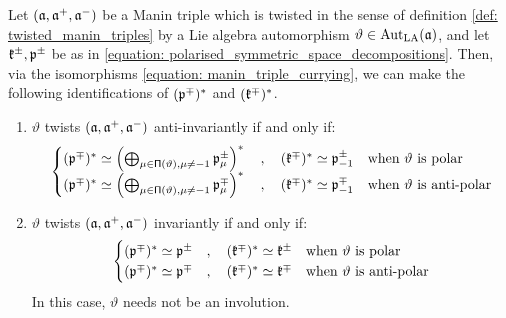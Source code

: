         \begin{lemma} \label{lemma: manin_triple_twists_and_duality}
            Let $(\mathfrak{a}, \mathfrak{a}^+, \mathfrak{a}^-)$ be a Manin triple which is twisted in the sense of definition \ref{def: twisted_manin_triples} by a Lie algebra automorphism $\vartheta \in \operatorname{Aut}_{\mathrm{LA}}(\mathfrak{a})$, and let $\mathfrak{k}^{\pm}, \mathfrak{p}^{\pm}$ be as in \eqref{equation: polarised_symmetric_space_decompositions}. Then, via the isomorphisms \eqref{equation: manin_triple_currying}, we can make the following identifications of $(\mathfrak{p}^{\mp})^*$ and $(\mathfrak{k}^{\mp})^*$.
            \begin{enumerate}
                \item $\vartheta$ twists $(\mathfrak{a}, \mathfrak{a}^+, \mathfrak{a}^-)$ anti-invariantly if and only if:
                    \begin{equation} \label{equation: anti_invariant_twist_duality}
                        \begin{cases}
                            (\mathfrak{p}^{\mp})^* \simeq \left( \bigoplus_{ \mu \in \mathsf{\Pi}(\vartheta), \mu \not = -1 } \mathfrak{p}_{\mu}^{\pm} \right)^* \quad, \quad (\mathfrak{k}^{\mp})^* \simeq \mathfrak{p}_{-1}^{\pm} & \text{when $\vartheta$ is polar}
                            \\
                            (\mathfrak{p}^{\mp})^* \simeq \left( \bigoplus_{ \mu \in \mathsf{\Pi}(\vartheta), \mu \not = -1 } \mathfrak{p}_{\mu}^{\mp} \right)^* \quad, \quad (\mathfrak{k}^{\mp})^* \simeq \mathfrak{p}_{-1}^{\mp} & \text{when $\vartheta$ is anti-polar}
                        \end{cases}
                    \end{equation}
                \item $\vartheta$ twists $(\mathfrak{a}, \mathfrak{a}^+, \mathfrak{a}^-)$ invariantly if and only if:
                    \begin{equation} \label{equation: invariant_twist_duality}
                        \begin{cases}
                            (\mathfrak{p}^{\mp})^* \simeq \mathfrak{p}^{\pm} \quad, \quad (\mathfrak{k}^{\mp})^* \simeq \mathfrak{k}^{\pm} & \text{when $\vartheta$ is polar}
                            \\
                            (\mathfrak{p}^{\mp})^* \simeq \mathfrak{p}^{\mp} \quad, \quad (\mathfrak{k}^{\mp})^* \simeq \mathfrak{k}^{\mp} & \text{when $\vartheta$ is anti-polar}
                        \end{cases}
                    \end{equation}
                In this case, $\vartheta$ needs not be an involution.
            \end{enumerate}
        \end{lemma}
